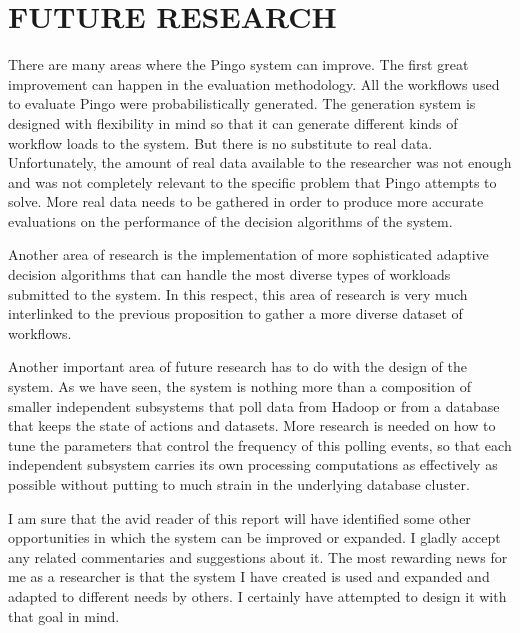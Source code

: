 \chapter{FUTURE RESEARCH}
\label{chap:future}
There are many areas where the Pingo system can improve.  The first great improvement can happen in the evaluation methodology. All the workflows used to evaluate Pingo were probabilistically generated.   The generation system is designed with flexibility in mind so that it can generate different kinds of workflow loads to the system.  But there is no substitute to real data. Unfortunately, the amount of real data available to the researcher was not enough and was not completely relevant to the specific problem that Pingo attempts to solve. More real data needs to be gathered in order to produce more accurate evaluations on the performance of the decision algorithms of the system.

Another area of research is the implementation of more sophisticated adaptive decision algorithms that can handle the most diverse types of workloads submitted to the system.  In this respect, this area of research is very much interlinked to the previous proposition to gather a more diverse dataset of workflows. 

Another important area of future research has to do with the design of the system. As we have seen, the system is nothing more than a composition of smaller independent subsystems that poll data from Hadoop or from a database that keeps the state of actions and datasets.  More research is needed on how to tune the parameters that control the frequency of this polling events, so that each independent subsystem carries its own processing computations as effectively as possible without putting to much strain in the underlying database cluster.

I am sure that the avid reader of this report will have identified some other opportunities in which the system can be improved or expanded. I gladly accept any related commentaries and suggestions about it. The most rewarding news for me as a researcher is that the system I have created is used and expanded and adapted to different needs by others. I certainly have attempted to design it with that goal in mind.
